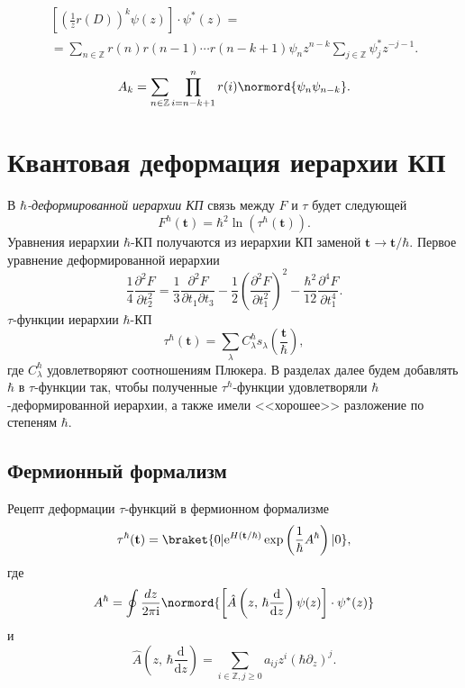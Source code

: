 \documentclass[a5paper,twoside]{extarticle}
\begin{document}
\begin{multline*}
	\left[ \left( \frac{1}{z}r(D)  \right) ^k
	\psi(z)\right] \cdot \psi^*(z)=\\=
	\sum_{n \in \mathbb{Z}}^{} r(n)r(n-1)\cdots
	r\left( n-k+1 \right) \psi_n z^{n-k}\sum_{j \in \mathbb{Z}}^{} \psi_j^* z^{-j-1}
.\end{multline*}
\begin{equation}
	A_k=\sum_{n\in \mathbb{Z}}^{} \prod_{i=n-k+1}^{n} 
	r(i)\normord{\psi_n \psi_{n-k}}	\label{}
.\end{equation}
\section{Квантовая деформация иерархии КП}


В $\hbar $\emph{-деформированной иерархии КП} связь между $F$ и $\tau$ будет следующей
\begin{equation}
	F^\hbar \left( \mathbf{t} \right) =
	\hbar ^2 \ln \left( \tau^\hbar \left( \mathbf{t} \right)  \right) 
.\end{equation} 
Уравнения иерархии $\hbar$-КП получаются  из
иерархии КП заменой  $\mathbf{t}\to \mathbf{t} /\hbar $.
Первое уравнение деформированной иерархии
\begin{equation}
	\frac{1}{4} \frac{\partial ^2 F}{\partial t_2^2} =\frac{1}{3} \frac{\partial ^2 F}{\partial t_1 \partial t_3} -\frac{1}{2} \left( \frac{\partial^2 F}{\partial t_1^2} \right) ^2-\frac{\hbar ^2}{12} \frac{\partial^4 F}{
	\partial t_1^4}
.\end{equation} 
$\tau$-функции  иерархии $\hbar $-КП
\begin{equation}
	\tau^\hbar \left( \mathbf{t} \right) =
	\sum_{\lambda}^{} C_\lambda^\hbar 
	s_\lambda \left( \frac{\mathbf{t}}{\hbar } \right) 
	\label{eq:3}
,\end{equation} 
где $C^\hbar _{\lambda}$ удовлетворяют соотношениям Плюкера.
В разделах далее будем добавлять $\hbar $
в $\tau$-функции так, чтобы полученные $\tau^\hbar $-функции
удовлетворяли $\hbar$-деформированной иерархии, а также
имели  <<хорошее>> разложение по степеням $\hbar $.
\subsection{Фермионный формализм}
Рецепт деформации $\tau$-функций в фермионном формализме
\begin{equation}
	\tau^\hbar (\mathbf{t})= \braket{0 | \mathrm{e} ^{H\left( \mathbf{t} /\hbar  \right) } \exp \left( \frac{1}{\hbar }A^\hbar  \right) | 0}
,\end{equation} 
где
\begin{equation}
A^\hbar = \oint \frac{dz}{2\pi \mathrm{i} }
\normord{\left[ \hat{A}\left( z,\,\hbar \frac{\mathrm{d} }{\mathrm{d} z}\right)\psi(z)   \right] \cdot \psi^*(z)}
\end{equation} 
и
\begin{equation}
	\hat{A}\left( z,\,\hbar  \frac{\mathrm{d} }{\mathrm{d} z} \right) = \sum_{i \in \mathbb{Z},j\ge 0}^{} a_{ij}
	z^i \left( \hbar  \partial_z \right) ^j
.\end{equation} 
\end{document}
